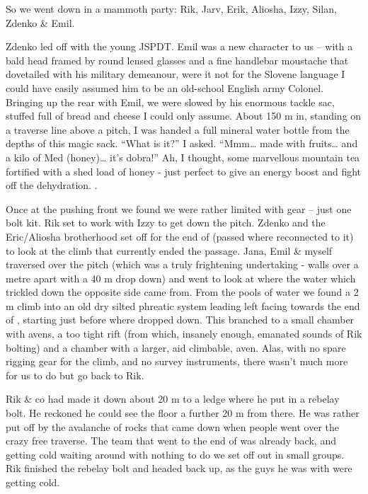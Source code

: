 So we went down in a mammoth party: Rik, Jarv, Erik, Aliosha, Izzy,
Silan, Zdenko \& Emil.

Zdenko led off with the young JSPDT. Emil was a new character to us --
with a bald head framed by round lensed glasses and a fine handlebar
moustache that dovetailed with his military demeanour, were it not for
the Slovene language I could have easily assumed him to be an old-school
English army Colonel. Bringing up the rear with Emil, we were slowed by
his enormous tackle sac, stuffed full of bread and cheese I could only
assume. About 150 m in, standing on a traverse line above a pitch, I was
handed a full mineral water bottle from the depths of this magic sack.
``What is it?'' I asked. ``Mmm\ldots{} made with fruits\ldots{} and a
kilo of Med (honey)\ldots{} it's dobra!'' Ah, I thought, some marvellous
mountain tea fortified with a shed load of honey - just perfect to give
an energy boost and fight off the dehydration. .

Once at the pushing front we found we were rather limited with gear --
just one bolt kit. Rik set to work with Izzy to get down the pitch.
Zdenko and the Eric/Aliosha brotherhood set off for the end of 
(passed where  reconnected to it) to look at the climb that
currently ended the passage. Jana, Emil \& myself traversed over the
pitch (which was a truly frightening undertaking - walls over a metre
apart with a 40 m drop down) and went to look at where the water which
trickled down the opposite side came from. From the pools of water we
found a 2 m climb into an old dry silted phreatic system leading left
facing towards the end of , starting just before where 
dropped down. This branched to a small chamber with avens, a too tight
rift (from which, insanely enough, emanated sounds of Rik bolting) and a
chamber with a larger, aid climbable, aven. Alas, with no spare rigging
gear for the climb, and no survey instruments, there wasn't much more
for us to do but go back to Rik.

Rik \& co had made it down about 20 m to a ledge where he put in a
rebelay bolt. He reckoned he could see the floor a further 20 m from
there. He was rather put off by the avalanche of rocks that came down
when people went over the crazy free traverse. The team that went to the
end of  was already back, and getting cold waiting around with
nothing to do we set off out in small groups. Rik finished the rebelay
bolt and headed back up, as the guys he was with were getting cold.

